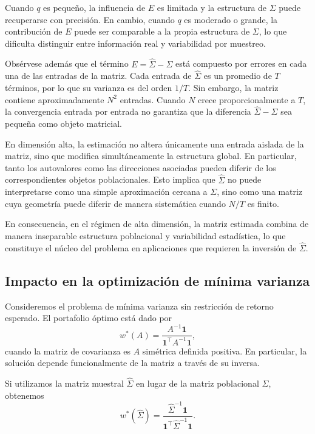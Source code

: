 \documentclass[letterpaper,12pt,oneside]{book}
\begin{document}
Cuando $q$ es pequeño, la influencia de $E$ es limitada y la estructura de $\Sigma$ puede recuperarse con precisión.
En cambio, cuando $q$ es moderado o grande, la contribución de $E$ puede ser comparable
a la propia estructura de $\Sigma$, lo que dificulta distinguir entre información real
y variabilidad por muestreo.

Obsérvese además que el término $E = \widehat{\Sigma} - \Sigma$ está compuesto por errores en cada una de las entradas de la matriz. Cada entrada de $\widehat{\Sigma}$ es un promedio de $T$ términos, por lo que su varianza es del orden $1/T$.
Sin embargo, la matriz contiene aproximadamente $N^2$ entradas. Cuando $N$ crece proporcionalmente a $T$, la convergencia entrada por entrada no garantiza que la diferencia $\widehat{\Sigma}-\Sigma$ sea pequeña como objeto matricial.

En dimensión alta, la estimación no altera únicamente una entrada aislada de la matriz, sino que modifica simultáneamente la estructura global.
En particular, tanto los autovalores como las direcciones asociadas pueden diferir de los correspondientes objetos poblacionales.
Esto implica que $\widehat{\Sigma}$ no puede interpretarse como una simple aproximación cercana a $\Sigma$, sino como una matriz cuya geometría puede diferir de manera sistemática cuando $N/T$ es finito.

En consecuencia, en el régimen de alta dimensión, la matriz estimada combina de manera inseparable
estructura poblacional y variabilidad estadística, lo que constituye el núcleo del problema
en aplicaciones que requieren la inversión de $\widehat{\Sigma}$.

\subsection*{Impacto en la optimización de mínima varianza}

Consideremos el problema de mínima varianza sin restricción de retorno esperado. El portafolio óptimo está dado por
\[
w^*(A) =
\frac{A^{-1}\mathbf{1}}
{\mathbf{1}^\top A^{-1}\mathbf{1}},
\]
cuando la matriz de covarianza es $A$ simétrica definida positiva.
En particular, la solución depende funcionalmente de la matriz a través de su inversa.

Si utilizamos la matriz muestral $\widehat{\Sigma}$ en lugar de la matriz poblacional $\Sigma$, obtenemos
\[
w^*(\widehat{\Sigma})
=
\frac{\widehat{\Sigma}^{-1}\mathbf{1}}
{\mathbf{1}^\top \widehat{\Sigma}^{-1}\mathbf{1}}.
\]
\end{document}
